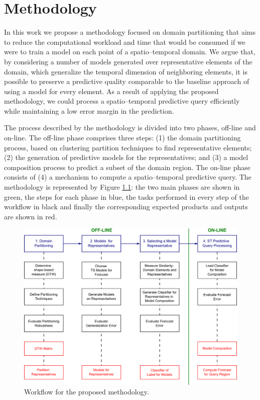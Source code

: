 \chapter[Methodology]{Methodology}
\label{Chapter:Methodology}

In this work we propose a methodology focused on domain partitioning that aims to reduce the computational workload and time that would be consumed if we were to train a model on each point of a spatio--temporal domain. We argue that, by considering a number of models generated over representative elements of the domain, which generalize the temporal dimension of neighboring elements, it is possible to preserve a predictive quality comparable to the baseline approach of using a model for every element. As a result of applying the proposed methodology, we could process a spatio--temporal predictive query efficiently while maintaining a low error margin in the prediction.

The process described by the methodology is divided into two phases, off-line and on-line. The off-line phase comprises three steps: (1) the domain partitioning process, based on clustering partition techniques to find representative elements; (2) the generation of predictive models for the representatives; and (3) a model composition process to predict a subset of the domain region. The on-line phase consists of (4) a mechanism to compute a spatio--temporal predictive query. The methodology is represented by Figure \ref{Fig:OverviewMethodology}: the two main phases are shown in green, the steps for each phase in blue, the tasks performed in every step of the workflow in black and finally the corresponding expected products and outputs are shown in red. 

\begin{figure}[h]
	\centering
	\includegraphics[scale=0.16]{../Figures/Methodology_Complete}
	\caption{Workflow for the proposed methodology.}
	\label{Fig:OverviewMethodology}
\end{figure}

